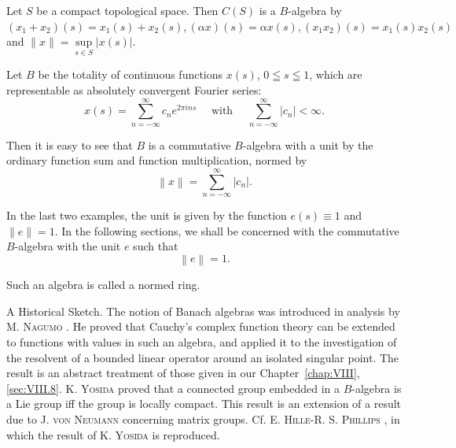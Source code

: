 \begin{example}\label{ex:XI.0.Example.2} Let $S$ be a compact topological space. Then $C(S)$ is a $B$-algebra by $(x_1 + x_2)(s) = x_1(s) + x_2(s), (\alpha x)(s) = \alpha x(s), (x_1x_2)(s) = x_1(s)x_2(s)$ and $\|x\| = \sup\limits_{s\in S}|x(s)|$. 
\end{example}

\begin{example}\label{ex:XI.0.Example.3} Let $B$ be the totality of continuous functions $x(s)$, $0 \leqq s \leqq 1$, which are representable as absolutely convergent Fourier series: 
\begin{equation}\label{eq:XI.0.3}
x (s) = \sum\limits_{n = - \infty} ^{\infty} c _{n} e ^{2 \pi i n s} \quad \text{ with } \quad \sum\limits_{n = - \infty} ^{\infty} | c _{n} | < \infty .
\end{equation}
\end{example}

Then it is easy to see that $B$ is a commutative $B$-algebra with a unit by the ordinary function sum and function multiplication, normed by 
\begin{equation}\label{eq:XI.0.4}
\left\| x \right\| = \sum\limits_{n = - \infty} ^{\infty} \left| c _{n} \right|.
\end{equation}

In the last two examples, the unit is given by the function $e(s) \equiv 1$ and $\|e\| = 1$. In the following sections, we shall be concerned with the commutative $B$-algebra with the unit $e$ such that 
\begin{equation}\label{eq:XI.0.5}
\left\| e \right\| = 1.
\end{equation}

Such an algebra is called a normed ring. 

A Historical Sketch. The notion of Banach algebras was introduced in analysis by M. \textsc{Nagumo} \cite{nagumo215}. He proved that Cauchy's complex function theory can be extended to functions with values in such an algebra, and applied it to the investigation of the resolvent of a bounded linear operator around an isolated singular point. The result is an abstract treatment of those given in our Chapter~\ref{chap:VIII}, \ref{sec:VIII.8}. K. \textsc{Yosida} \cite{yosida354} proved that a connected group embedded in a $B$-algebra is a Lie group iff the group is locally compact. This result is an extension of a result due to J. \textsc{von} \textsc{Neumann} \cite{neumann233} concerning matrix groups. Cf. E. \textsc{Hille}-R. S. \textsc{Phillips} \cite{hille97}, in which the result of K. \textsc{Yosida} \cite{yosida354} is reproduced. 

